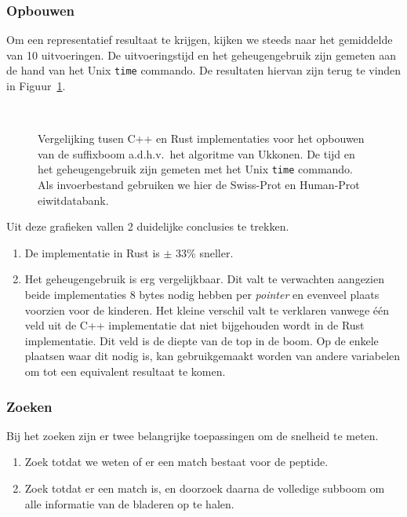 \subsubsection{Opbouwen}
Om een representatief resultaat te krijgen, kijken we steeds naar het gemiddelde van 10 uitvoeringen.
De uitvoeringstijd en het geheugengebruik zijn gemeten aan de hand van het Unix \texttt{time} commando.
De resultaten hiervan zijn terug te vinden in Figuur~\ref{fig:tree_building}.
\begin{figure}[H]
    \centering
    \\[4ex] %

    \caption{Vergelijking tusen C++ en Rust implementaties voor het opbouwen van de suffixboom a.d.h.v.~het algoritme van Ukkonen. De tijd en het geheugengebruik zijn gemeten met het Unix \texttt{time} commando. Als invoerbestand gebruiken we hier de Swiss-Prot en Human-Prot eiwitdatabank.}\label{fig:tree_building}
\end{figure}

Uit deze grafieken vallen 2 duidelijke conclusies te trekken.
\begin{enumerate}
    \item De implementatie in Rust is $\pm$ 33\% sneller.
    \item Het geheugengebruik is erg vergelijkbaar.
    Dit valt te verwachten aangezien beide implementaties 8 bytes nodig hebben per \textit{pointer} en evenveel plaats voorzien voor de kinderen.
    Het kleine verschil valt te verklaren vanwege één veld uit de C++ implementatie dat niet bijgehouden wordt in de Rust implementatie.
    Dit veld is de diepte van de top in de boom.
    Op de enkele plaatsen waar dit nodig is, kan gebruikgemaakt worden van andere variabelen om tot een equivalent resultaat te komen.
\end{enumerate}

\subsubsection{Zoeken}
Bij het zoeken zijn er twee belangrijke toepassingen om de snelheid te meten.
\begin{enumerate}
    \item Zoek totdat we weten of er een match bestaat voor de peptide.
    \item Zoek totdat er een match is, en doorzoek daarna de volledige subboom om alle informatie van de bladeren op te halen.

\end{enumerate}

